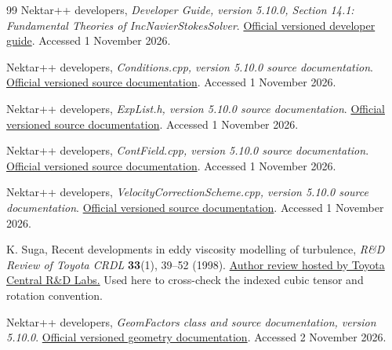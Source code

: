 \documentclass[11pt,a4paper]{article}
\numberwithin{equation}{section}
\begin{document}
\begin{thebibliography}{99}
Nektar++ developers,
\emph{Developer Guide, version 5.10.0, Section 14.1:
Fundamental Theories of IncNavierStokesSolver}.
\href{https://doc.nektar.info/developerguide/5.10.0/developer-guidese49.html}
{Official versioned developer guide}.
Accessed 1 November 2026.

Nektar++ developers,
\emph{Conditions.cpp, version 5.10.0 source documentation}.
\href{https://doc.nektar.info/doxygen/5.10.0/_conditions_8cpp_source.html}
{Official versioned source documentation}.
Accessed 1 November 2026.

Nektar++ developers,
\emph{ExpList.h, version 5.10.0 source documentation}.
\href{https://doc.nektar.info/doxygen/5.10.0/_exp_list_8h_source.html}
{Official versioned source documentation}.
Accessed 1 November 2026.

Nektar++ developers,
\emph{ContField.cpp, version 5.10.0 source documentation}.
\href{https://doc.nektar.info/doxygen/5.10.0/_cont_field_8cpp_source.html}
{Official versioned source documentation}.
Accessed 1 November 2026.

Nektar++ developers,
\emph{VelocityCorrectionScheme.cpp, version 5.10.0 source documentation}.
\href{https://doc.nektar.info/doxygen/5.10.0/_velocity_correction_scheme_8cpp_source.html}
{Official versioned source documentation}.
Accessed 1 November 2026.

K. Suga,
Recent developments in eddy viscosity modelling of turbulence,
\emph{R\&D Review of Toyota CRDL} \textbf{33}(1), 39--52 (1998).
\href{https://www.tytlabs.co.jp/en/japanese/review/rev331pdf/331_039suga.pdf}
{Author review hosted by Toyota Central R\&D Labs.}
Used here to cross-check the indexed cubic tensor and rotation convention.

Nektar++ developers,
\emph{GeomFactors class and source documentation, version 5.10.0}.
\href{https://doc.nektar.info/doxygen/5.10.0/class_nektar_1_1_spatial_domains_1_1_geom_factors.html}
{Official versioned geometry documentation}.
Accessed 2 November 2026.

\end{thebibliography}
\end{document}
